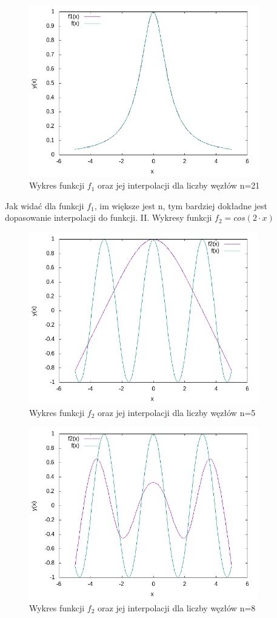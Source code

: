 \documentclass{article}
\begin{document}
\begin{figure}[h!]
\centering
\includegraphics[width=10cm]{f1_21.png}
\caption{Wykres funkcji $f_1$ oraz jej interpolacji dla liczby węzłów n=21}
\label{fig:obrazek f1_21}
\end{figure}

Jak widać dla funkcji $f_1$, im większe jest n, tym bardziej dokładne jest dopasowanie interpolacji do funkcji.
\newpage
II. Wykresy funkcji $f_2=cos(2\cdot x)$
\begin{figure}[h!]
\centering
\includegraphics[width=10cm]{f2_5.png}
\caption{Wykres funkcji $f_2$ oraz jej interpolacji dla liczby węzłów n=5}
\label{fig:obrazek f2_5}
\end{figure}

\begin{figure}[h!]
\centering
\includegraphics[width=10cm]{f2_8.png}
\caption{Wykres funkcji $f_2$ oraz jej interpolacji dla liczby węzłów n=8}
\label{fig:obrazek f2_8}
\end{figure}
\end{document}
